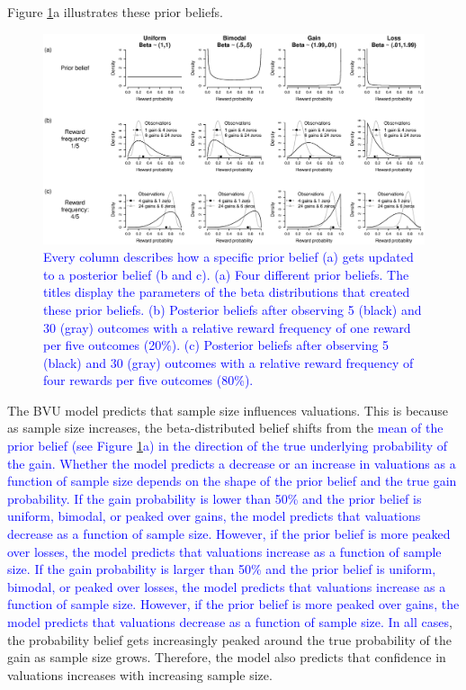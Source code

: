 \documentclass[a4paper, man, natbib, floatsintext]{apa6} %
\begin{document}
Figure \ref{fig:sensi}a illustrates these prior beliefs.
\begin{figure}[htbp] 
  \centering
\includegraphics[width=1\linewidth, keepaspectratio]{sensi1.eps}
  \caption{\textcolor{blue}{Every column describes how a specific prior belief (a) gets updated to a posterior belief (b and c). (a) Four different prior beliefs. The titles display the parameters of the beta distributions that created these prior beliefs. (b) Posterior beliefs after observing 5 (black) and 30 (gray) outcomes with a relative reward frequency of one reward per five outcomes (20\%). (c) Posterior beliefs after observing 5 (black) and 30 (gray) outcomes with a relative reward frequency of four rewards per five outcomes (80\%).}}
  \label{fig:sensi}
\end{figure}




The BVU model predicts that sample size influences valuations. This is because as sample size increases, the beta-distributed belief shifts from the \textcolor{blue}{mean of the prior belief (see Figure \ref{fig:sensi}a) in the direction of the true underlying probability of the gain. Whether the model predicts a decrease or an increase in valuations as a function of sample size depends on the shape of the prior belief and the true gain probability. If the gain probability is lower than 50\% and the prior belief is uniform, bimodal, or peaked over gains, the model predicts that valuations decrease as a function of sample size. However, if the prior belief is more peaked over losses, the model predicts that valuations increase as a function of sample size. If the gain probability is larger than 50\% and the prior belief is uniform, bimodal, or peaked over losses, the model predicts that valuations increase as a function of sample size. However, if the prior belief is more peaked over gains, the model predicts that valuations decrease as a function of sample size. In all cases}, the probability belief gets increasingly peaked around the true probability of the gain as sample size grows. Therefore, the model also predicts that confidence in valuations increases with increasing sample size. %
\end{document}
